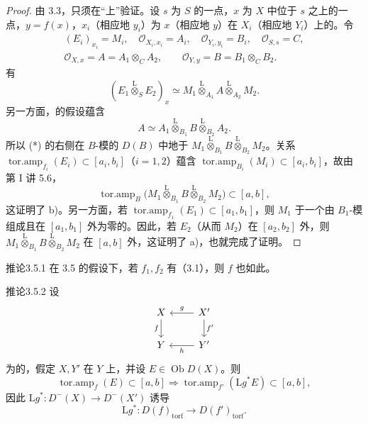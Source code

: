 \begin{proof}
由 3.3，只须在“上”验证。设 $s$ 为 $S$ 的一点，$x$ 为 $X$ 中位于 $s$ 之上的一点，$y=f(x)$，$x_i$（相应地 $y_i$）为 $x$（相应地 $y$）在 $X_i$（相应地 $Y_i$）上的。令
\[
\begin{gathered}
(E_i)_{x_i}=M_i,\quad\mathcal O_{X_i,x_i}=A_i,\quad\mathcal O_{Y_i,y_i}=B_i,\quad\mathcal O_{S,s}=C,\\
\mathcal O_{X,x}=A=A_1\otimes_CA_2,\qquad \mathcal O_{Y,y}=B=B_1\otimes_CB_2.
\end{gathered}
\]
有
\[(E_1\mathbin{\overset{\mathrm L}{\otimes}}_SE_2)_x\simeq M_1\mathbin{\overset{\mathrm L}{\otimes}}_{A_1}A\mathbin{\overset{\mathrm L}{\otimes}}_{A_2}M_2.\tag{*}\]
另一方面，的假设蕴含
\[A\simeq A_1\mathbin{\overset{\mathrm L}{\otimes}}_{B_1}B\mathbin{\overset{\mathrm L}{\otimes}}_{B_2}A_2.\]
所以 (*) 的右侧在 $B$-模的 $D(B)$ 中地于
$M_1\mathbin{\overset{\mathrm L}{\otimes}}_{B_1}B\mathbin{\overset{\mathrm L}{\otimes}}_{B_2}M_2$。关系 $\operatorname{tor.amp}_{f_i}(E_i)\subset[a_i,b_i]$（$i=1,2$）蕴含 $\operatorname{tor.amp}_{B_i}(M_i)\subset[a_i,b_i]$，故由第 I 讲 5.6，
\[\operatorname{tor.amp}_B\bigl(M_1\mathbin{\overset{\mathrm L}{\otimes}}_{B_1}B\mathbin{\overset{\mathrm L}{\otimes}}_{B_2}M_2\bigr)\subset[a,b],\]
这证明了 b)。另一方面，若 $\operatorname{tor.amp}_{f_1}(E_1)\subset[a_1,b_1]$，则 $M_1$ 于一个由 $B_1$-模组成且在 $[a_1,b_1]$ 外为零的。因此，若 $E_2$（从而 $M_2$）在 $[a_2,b_2]$ 外，则 $M_1\mathbin{\overset{\mathrm L}{\otimes}}_{B_1}B\mathbin{\overset{\mathrm L}{\otimes}}_{B_2}M_2$ 在 $[a,b]$ 外，这证明了 a)，也就完成了证明。
\end{proof}
\begin{SGAresult}{推论}{3.5.1}
在 3.5 的假设下，若 $f_1,f_2$ 有（3.1），则 $f$ 也如此。
\end{SGAresult}
\begin{SGAresult}{推论}{3.5.2}
设
\[
\begin{tikzcd}X\arrow[d,"f"']&X'\arrow[l,"g"']\arrow[d,"f'"]\\Y&Y'\arrow[l,"h"]\end{tikzcd}
\]
为的，假定 $X,Y'$ 在 $Y$ 上，并设 $E\in\operatorname{Ob}D(X)$。则
\[\operatorname{tor.amp}_f(E)\subset[a,b]\Longrightarrow\operatorname{tor.amp}_{f'}(\mathrm Lg^*E)\subset[a,b],\]
因此 $\mathrm Lg^*:D^-(X)\to D^-(X')$ 诱导
\[\mathrm Lg^*:D(f)_{\mathrm{torf}}\longrightarrow D(f')_{\mathrm{torf}}.\]
\end{SGAresult}
